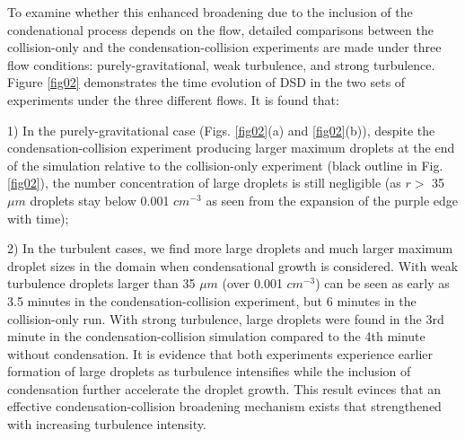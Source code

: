 To examine whether this enhanced broadening due to the inclusion of the condenational process depends on the flow, detailed comparisons between the collision-only and the condensation-collision experiments are made under three flow conditions: purely-gravitational, weak turbulence, and strong turbulence. Figure \ref{fig02} demonstrates the time evolution of DSD in the two sets of experiments under the three different flows. It is found that:

1) In the purely-gravitational case (Figs. \ref{fig02}(a) and \ref{fig02}(b)), despite the condensation-collision experiment producing larger maximum droplets at the end of the simulation relative to the collision-only experiment (black outline in Fig. \ref{fig02}), the number concentration of large droplets is still negligible (as $r>$ 35 $\mu m$ droplets stay below 0.001 $cm^{-3}$ as seen from the expansion of the purple edge with time);

2) In the turbulent cases, we find more large droplets and much larger maximum droplet sizes in the domain when condensational growth is considered. With weak turbulence droplets larger than 35 $\mu m$ (over 0.001 $cm^{-3}$) can be seen as early as 3.5 minutes in the condensation-collision experiment, but 6 minutes in the collision-only run. With strong turbulence,  large droplets were found in the 3rd minute in the condensation-collision simulation compared to the 4th minute without condensation. It is evidence that both experiments experience earlier formation of large droplets as turbulence intensifies while the inclusion of condensation further accelerate the droplet growth. This result evinces that an effective condensation-collision broadening mechanism exists that strengthened with increasing turbulence intensity.

